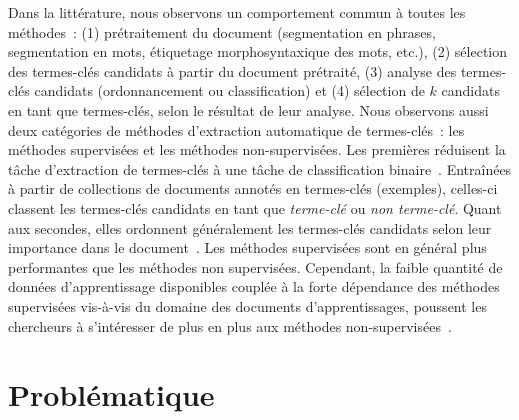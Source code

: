       Dans la littérature, nous observons un comportement commun à
      toutes les méthodes~: (1) prétraitement du document (segmentation en
      phrases, segmentation en mots, étiquetage morphosyntaxique des mots,
      etc.), (2) sélection des termes-clés candidats à partir du document
      prétraité, (3) analyse des termes-clés candidats (ordonnancement ou
      classification) et (4) sélection de $k$ candidats en tant que termes-clés,
      selon le résultat de leur analyse. Nous observons aussi deux catégories de
      méthodes d'extraction automatique de termes-clés~: les méthodes
      supervisées et les méthodes non-supervisées. Les premières réduisent la
      tâche d'extraction de termes-clés à une tâche de classification
      binaire~\citep{witten1999kea}. Entraînées à partir de collections de
      documents annotés en termes-clés (exemples), celles-ci classent les
      termes-clés candidats en tant que \textit{terme-clé} ou \textit{non
      terme-clé}. Quant aux secondes, elles ordonnent généralement les
      termes-clés candidats selon leur importance dans le
      document~\citep{wan2008expandrank}. Les méthodes supervisées sont en
      général plus performantes que les méthodes non supervisées. Cependant, la
      faible quantité de données d'apprentissage disponibles couplée à
      la forte dépendance des méthodes supervisées vis-à-vis du domaine des
      documents d'apprentissages, poussent les
      chercheurs à s'intéresser de plus en plus aux méthodes
      non-supervisées~\citep{hassan2010conundrums}.

    \section{Problématique}

